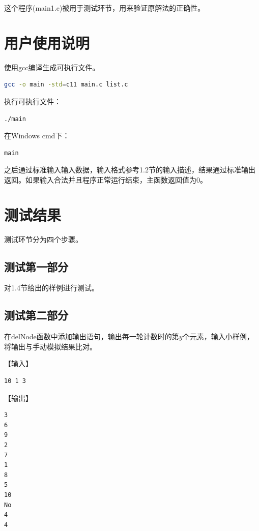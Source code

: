 \documentclass{article}
\begin{document}
这个程序(main1.c)被用于测试环节，用来验证原解法的正确性。

\section{用户使用说明}

使用gcc编译生成可执行文件。

\begin{lstlisting}[language={bash},
    basicstyle=\small\menlo]
gcc -o main -std=c11 main.c list.c
\end{lstlisting}

执行可执行文件：

\begin{lstlisting}[language={bash},
    basicstyle=\small\menlo]
./main
\end{lstlisting}

在Windows cmd下：

\begin{lstlisting}[language={bash},
    basicstyle=\small\menlo]
main
\end{lstlisting}

之后通过标准输入输入数据，输入格式参考1.2节的输入描述，结果通过标准输出返回。如果输入合法并且程序正常运行结束，主函数返回值为0。

\section{测试结果}

测试环节分为四个步骤。

\subsection{测试第一部分}

对1.4节给出的样例进行测试。

\subsection{测试第二部分}

在delNode函数中添加输出语句，输出每一轮计数时的第$y$个元素，输入小样例，将输出与手动模拟结果比对。

【输入】

\begin{lstlisting}[language={bash},
    basicstyle=\small\menlo]
10 1 3
\end{lstlisting}

【输出】

\begin{lstlisting}[language={bash},
    basicstyle=\small\menlo]
3
6
9
2
7
1
8
5
10
No
4
4
\end{lstlisting}
\end{document}
